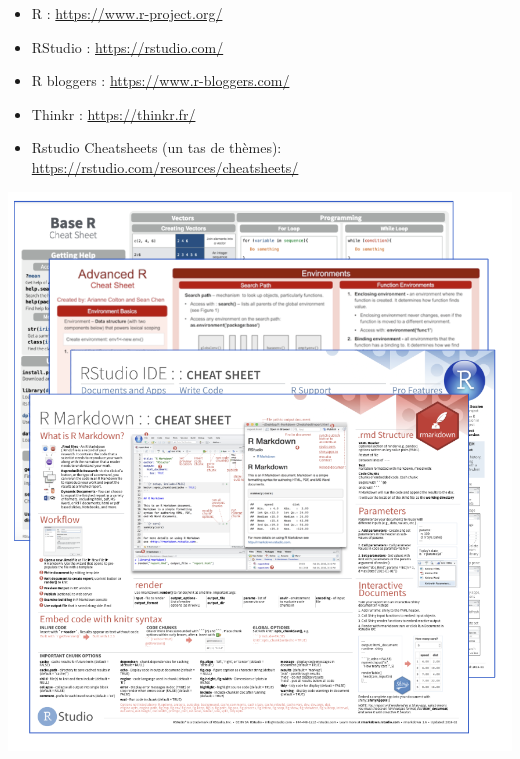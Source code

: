 \documentclass[
]{book}
\providecommand{\tightlist}{%
  \setlength{\itemsep}{0pt}\setlength{\parskip}{0pt}}
\begin{document}
\begin{itemize}
\tightlist
\item
  R : \url{https://www.r-project.org/}
\item
  RStudio : \url{https://rstudio.com/}
\item
  R bloggers : \url{https://www.r-bloggers.com/}
\item
  Thinkr : \url{https://thinkr.fr/}
\item
  Rstudio Cheatsheets (un tas de thèmes): \url{https://rstudio.com/resources/cheatsheets/}
\end{itemize}

\includegraphics{images/cheatSheet.png}

  
\end{document}
